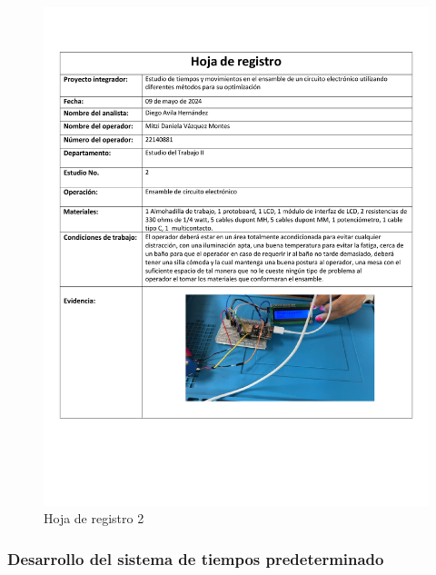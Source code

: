 \begin{enumerate}
\begin{figure}[H]
        \includegraphics[scale=0.4]{3/Img/hojaDeRegistro2.pdf}
        \caption{Hoja de registro 2} 
        \label{fig:hojaDeRegistro2}
    \end{figure}
    \end{enumerate}
    \subsubsection{Desarrollo del sistema de tiempos predeterminado}
    
